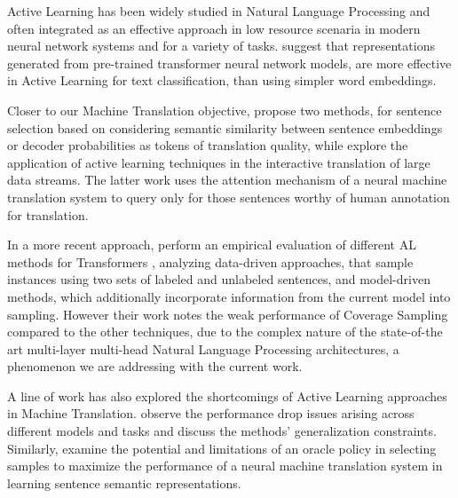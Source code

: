 Active Learning has been widely studied in Natural Language Processing and often integrated as an effective approach in low resource scenaria in modern neural network systems and for a variety of tasks. 
\citet{lu2020investigating} suggest that representations generated from pre-trained transformer neural network models, are more effective in Active Learning for text classification, than using simpler word embeddings.

Closer to our Machine Translation objective, \citet{zhang2018active} propose two methods, for sentence selection based on considering semantic similarity between sentence embeddings or decoder probabilities as tokens of translation quality, while \citet{peris2020active} explore the application of active learning techniques in the interactive translation of large data streams. The latter work uses the attention mechanism of a neural machine translation system to query only for those sentences worthy of human annotation for translation. 

In a more recent approach, \citet{zeng2019empirical} perform an empirical evaluation of different AL methods for Transformers \cite{vaswani2017attention}, analyzing data-driven approaches, that sample instances using two sets of labeled and unlabeled sentences, and model-driven methods, which additionally incorporate information from the current model into sampling. However their work notes the weak performance of Coverage Sampling compared to the other techniques, due to the complex nature of the state-of-the art multi-layer multi-head Natural Language Processing architectures, a phenomenon we are addressing with the current work.

A line of work has also explored the shortcomings of Active Learning approaches in Machine Translation. \citet{lowell2018practical} observe the performance drop issues arising across different models and tasks and discuss the methods' generalization constraints. Similarly, \citet{koshorek2019limits} examine the potential and limitations of an oracle policy in selecting samples to maximize the performance of a neural machine translation system in learning sentence semantic representations.



